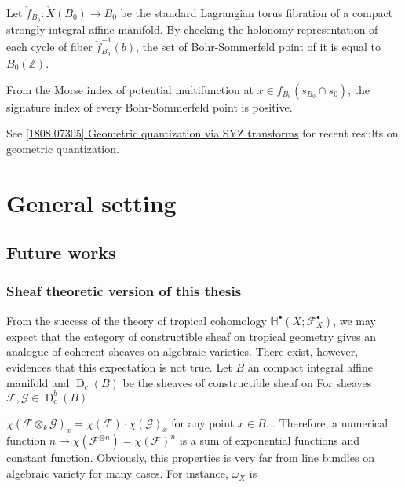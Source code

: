 \documentclass[a4paper,dvipdfmx,reqno,12pt]{amsart}
\theoremstyle{definition}
\newcommand{\Z}{\mathbb{Z}}%
\newcommand{\mb}[1]{\mathbb{#1}}%
\newcommand{\mcal}[1]{\mathcal{#1}}%
\newcommand{\opn}[1]{\operatorname{#1}}
\numberwithin{equation}{section}
\begin{document}
Let $\check{f}_{B_0}:\check{X}(B_0)\to B_0$ be the standard Lagrangian torus fibration of a compact strongly integral affine manifold. By checking the holonomy representation of each cycle of fiber $\check{f}_{B_0}^{-1}(b)$,
the set of Bohr-Sommerfeld point of it is equal to $B_0(\Z)$.

From the Morse index of potential multifunction at 
$x\in f_{B_0}(s_{B_0}\cap s_0)$, the signature 
index of every Bohr-Sommerfeld point is positive.

See
\href{https://arxiv.org/abs/1808.07305}{[1808.07305] Geometric quantization via SYZ transforms} for recent results on geometric quantization.


\section{General setting}







\subsection{Future works}

\subsubsection{Sheaf theoretic version of this thesis}

From the success of the theory of tropical cohomology
$\mb{H}^{\bullet}(X;\mcal{F}_X^{\bullet})$,
we may expect that the category of constructible sheaf
on tropical geometry gives an analogue of coherent
sheaves on algebraic varieties.
There exist, however, evidences that
this expectation is not true.
Let $B$ an compact integral affine manifold and
$\opn{D}_c(B)$ be the sheaves of constructible sheaf
on
For sheaves $\mcal{F},\mcal{G}\in \opn{D}_{c}^{b}(B)$

$\chi(\mcal{F}\otimes_k \mcal{G})_x
  =\chi(\mcal{F})\cdot \chi(\mcal{G})_x$ for any point
$x\in B$.
\cite[(9.7.2)]{MR1299726}.
Therefore, a numerical function
$n\mapsto \chi(\mcal{F}^{\otimes n})=\chi(\mcal{F})^{n}$
is a sum of exponential functions and constant function.
Obviously, this properties is very far
from line bundles on algebraic variety for many cases.
For instance, $\omega_X$ is



  

 
\end{document}
